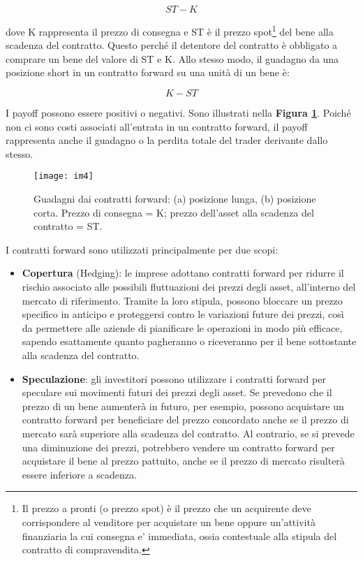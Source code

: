 \documentclass[12pt,a4paper]{report}
\begin{document}
\[ST - K\]

dove K rappresenta il prezzo di consegna e ST è il prezzo spot\footnote{Il prezzo a pronti 
(o prezzo spot) è il prezzo che un acquirente deve corrispondere al venditore per 
acquistare un bene oppure un'attività finanziaria la cui consegna e' immediata, ossia 
contestuale alla stipula del contratto di compravendita.} del bene alla scadenza del 
contratto. Questo perché il detentore del contratto è obbligato a comprare un bene del 
valore di ST e K. Allo stesso modo, il guadagno da una posizione short in un contratto 
forward su una unità di un bene è: 

\[K - ST\]

I payoff possono essere positivi o negativi. Sono illustrati nella \textbf{Figura 
\ref{etichetta-univoca2}}. Poiché non ci sono costi associati all'entrata in un contratto forward, il payoff rappresenta anche il guadagno o la perdita totale del trader derivante dallo stesso.

\begin{figure}
    \centering
    \texttt{[image: im4]}
    \caption{Guadagni dai contratti forward: (a) posizione lunga, (b) posizione corta.
Prezzo di consegna = K; prezzo dell'asset alla scadenza del contratto = ST.}
    \label{etichetta-univoca2}
\end{figure}

I contratti forward sono utilizzati principalmente per due scopi:

\begin{itemize}
    
\item \textbf{Copertura} (Hedging): le imprese adottano contratti forward per ridurre il rischio associato alle possibili fluttuazioni dei prezzi degli asset, all'interno del mercato di riferimento. Tramite la loro stipula, possono bloccare un prezzo specifico in anticipo e proteggersi contro le variazioni future dei prezzi, così da permettere alle aziende di pianificare le operazioni in modo più efficace, sapendo esattamente quanto pagheranno o riceveranno per il bene sottostante alla scadenza del contratto.

\item \textbf{Speculazione}: gli investitori possono utilizzare i contratti forward per speculare sui movimenti futuri dei prezzi degli asset. Se prevedono che il prezzo di un bene aumenterà in futuro, per esempio, possono acquistare un contratto forward per beneficiare del prezzo concordato anche se il prezzo di mercato sarà superiore alla scadenza del contratto. Al contrario, se si prevede una diminuzione dei prezzi, potrebbero vendere un contratto forward per acquistare il bene al prezzo pattuito, anche se il prezzo di mercato risulterà essere inferiore a scadenza.

\end{itemize}
\end{document}
